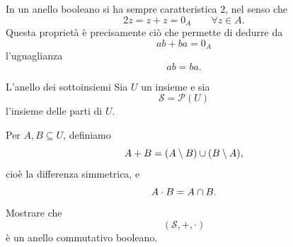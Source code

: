\documentclass[a4paper]{article}
\begin{document}
\begin{radioactive}
\begin{snippetremark}{}
    In un anello booleano si ha sempre caratteristica \(2\), nel senso che
    \[
        2z=z+z=0_A
        \qquad
        \forall z\in A.
    \]
    Questa proprietà è precisamente ciò che permette di dedurre da
    \[
        ab+ba=0_A
    \]
    l'uguaglianza
    \[
        ab=ba.
    \]
\end{snippetremark}
\end{radioactive}

\begin{radioactive}
\begin{snippetexercise}{L'anello dei sottoinsiemi}
    Sia \(U\) un insieme e sia
    \[
        \mathcal{S}=\mathcal{P}(U)
    \]
    l'insieme delle parti di \(U\).

    Per \(A,B\subseteq U\), definiamo
    \[
        A+B=(A\setminus B)\cup(B\setminus A),
    \]
    cioè la differenza simmetrica, e
    \[
        A\cdot B=A\cap B.
    \]
    Mostrare che
    \[
        (\mathcal{S},+,\cdot)
    \]
    è un anello commutativo booleano.
\end{snippetexercise}
\end{radioactive}
\end{document}
